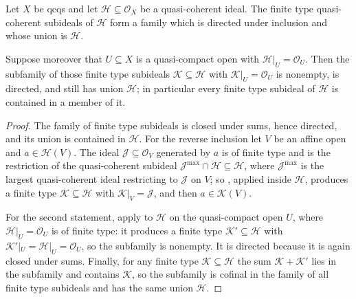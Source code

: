 \begin{lemma}
  \label{lemma:nagata-ideal-directed-union-finite-type}
  \leanok

  Let $X$ be qcqs and let $\mathcal H\subseteq\mathcal O_X$ be a quasi-coherent
  ideal.  The finite type quasi-coherent subideals of $\mathcal H$ form a family
  which is directed under inclusion and whose union is $\mathcal H$.

  Suppose moreover that $U\subseteq X$ is a quasi-compact open with
  $\mathcal H|_U=\mathcal O_U$.  Then the subfamily of those finite type
  subideals $\mathcal K\subseteq\mathcal H$ with $\mathcal K|_U=\mathcal O_U$ is
  nonempty, is directed, and still has union $\mathcal H$; in particular every
  finite type subideal of $\mathcal H$ is contained in a member of it.
\end{lemma}

\begin{proof}
  \leanok
  The family of finite type subideals is closed under sums, hence directed, and
  its union is contained in $\mathcal H$.  For the reverse inclusion let $V$ be
  an affine open and $a\in\mathcal H(V)$.  The ideal $\mathcal J\subseteq
  \mathcal O_V$ generated by $a$ is of finite type and is the restriction of the
  quasi-coherent subideal $\mathcal J^{\max}\cap\mathcal H\subseteq\mathcal H$,
  where $\mathcal J^{\max}$ is the largest quasi-coherent ideal restricting to
  $\mathcal J$ on $V$; so
  , applied inside
  $\mathcal H$, produces a finite type $\mathcal K\subseteq\mathcal H$ with
  $\mathcal K|_V=\mathcal J$, and then $a\in\mathcal K(V)$.

  For the second statement, apply
   to $\mathcal H$ on the
  quasi-compact open $U$, where $\mathcal H|_U=\mathcal O_U$ is of finite type:
  it produces a finite type $\mathcal K'\subseteq\mathcal H$ with
  $\mathcal K'|_U=\mathcal H|_U=\mathcal O_U$, so the subfamily is nonempty.  It
  is directed because it is again closed under sums.  Finally, for any finite
  type $\mathcal K\subseteq\mathcal H$ the sum $\mathcal K+\mathcal K'$ lies in
  the subfamily and contains $\mathcal K$, so the subfamily is cofinal in the
  family of all finite type subideals and has the same union $\mathcal H$.
\end{proof}

